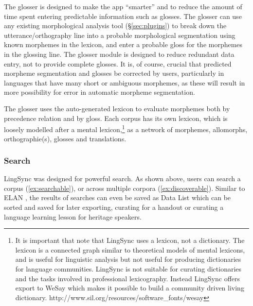 \documentclass[letterpaper, 12pt, dvips]{mitwpl}
\begin{document}
The glosser is designed to make the app ``smarter'' and to reduce the amount of time spent entering predictable information such as glosses.
The glosser can use any existing morphological analysis tool (\S \ref{sec:plugins}) to break down the utterance/orthography line  into a probable morphological segmentation using known morphemes in the lexicon,
and enter a probable gloss for the morphemes in the glossing line.
The glosser module is designed to reduce redundant data entry,
not to provide complete glosses.
It is, of course, crucial that predicted morpheme segmentation and glosses be corrected by users,
particularly in languages that have many short or ambiguous morphemes,
as these will result in more possibility for error in automatic morpheme segmentation.
 

The glosser uses the auto-generated lexicon to evaluate morphemes both by precedence relation and by gloss.
Each corpus has its own lexicon,
which is loosely modelled after a mental lexicon,\footnote{It is important that note that LingSync uses a lexicon, not a dictionary. The lexicon is a connected graph similar to theoretical models of mental lexicons, and is useful for linguistic analysis but not useful for producing dictionaries for language communities. LingSync is not suitable for curating dictionaries and the tasks involved in professional lexicography. Instead LingSync offers export to WeSay which makes it possible to build a community driven living dictionary. http://www.sil.org/resources/software\_fonts/wesay} 
as a network of morphemes,
allomorphs,
orthographie(s),
glosses and translations.


\subsubsection{Search}

LingSync was designed for powerful search.
As shown above, users can search a corpus (\ref{ex:searchable}),
or across multiple corpora (\ref{ex:discoverable}).
Similar to ELAN \citep{Wittenburg:2006}, 
the results of  searches can even be saved as Data List which can be sorted and
saved for later exporting, curating for a handout or curating a language learning lesson for heritage speakers.
\end{document}

